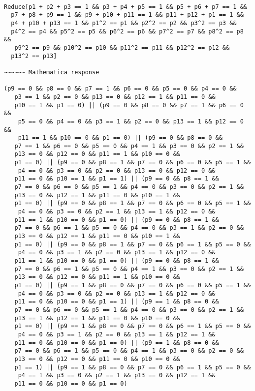 \documentclass[%
 showpacs,
 showkeys,
 preprintnumbers,
 amsmath,amssymb,
 aps,
  pra,
  longbibliography,
 floatfix,
 ]{revtex4-1}
\begin{document}
{ \begin{lstlisting}[backgroundcolor=\color{yellow!10},framerule=0pt,breaklines=true, frame=tb]

Reduce[p1 + p2 + p3 == 1 && p3 + p4 + p5 == 1 && p5 + p6 + p7 == 1 &&
  p7 + p8 + p9 == 1 && p9 + p10 + p11 == 1 && p11 + p12 + p1 == 1 &&
  p4 + p10 + p13 == 1 && p1^2 == p1 && p2^2 == p2 && p3^2 == p3 &&
  p4^2 == p4 && p5^2 == p5 && p6^2 == p6 && p7^2 == p7 && p8^2 == p8 &&
   p9^2 == p9 && p10^2 == p10 && p11^2 == p11 && p12^2 == p12 &&
  p13^2 == p13]

~~~~~~ Mathematica response

(p9 == 0 && p8 == 0 && p7 == 1 && p6 == 0 && p5 == 0 && p4 == 0 &&
   p3 == 1 && p2 == 0 && p13 == 0 && p12 == 1 && p11 == 0 &&
   p10 == 1 && p1 == 0) || (p9 == 0 && p8 == 0 && p7 == 1 && p6 == 0 &&
    p5 == 0 && p4 == 0 && p3 == 1 && p2 == 0 && p13 == 1 && p12 == 0 &&
    p11 == 1 && p10 == 0 && p1 == 0) || (p9 == 0 && p8 == 0 &&
   p7 == 1 && p6 == 0 && p5 == 0 && p4 == 1 && p3 == 0 && p2 == 1 &&
   p13 == 0 && p12 == 0 && p11 == 1 && p10 == 0 &&
   p1 == 0) || (p9 == 0 && p8 == 1 && p7 == 0 && p6 == 0 && p5 == 1 &&
    p4 == 0 && p3 == 0 && p2 == 0 && p13 == 0 && p12 == 0 &&
   p11 == 0 && p10 == 1 && p1 == 1) || (p9 == 0 && p8 == 1 &&
   p7 == 0 && p6 == 0 && p5 == 1 && p4 == 0 && p3 == 0 && p2 == 1 &&
   p13 == 0 && p12 == 1 && p11 == 0 && p10 == 1 &&
   p1 == 0) || (p9 == 0 && p8 == 1 && p7 == 0 && p6 == 0 && p5 == 1 &&
    p4 == 0 && p3 == 0 && p2 == 1 && p13 == 1 && p12 == 0 &&
   p11 == 1 && p10 == 0 && p1 == 0) || (p9 == 0 && p8 == 1 &&
   p7 == 0 && p6 == 1 && p5 == 0 && p4 == 0 && p3 == 1 && p2 == 0 &&
   p13 == 0 && p12 == 1 && p11 == 0 && p10 == 1 &&
   p1 == 0) || (p9 == 0 && p8 == 1 && p7 == 0 && p6 == 1 && p5 == 0 &&
    p4 == 0 && p3 == 1 && p2 == 0 && p13 == 1 && p12 == 0 &&
   p11 == 1 && p10 == 0 && p1 == 0) || (p9 == 0 && p8 == 1 &&
   p7 == 0 && p6 == 1 && p5 == 0 && p4 == 1 && p3 == 0 && p2 == 1 &&
   p13 == 0 && p12 == 0 && p11 == 1 && p10 == 0 &&
   p1 == 0) || (p9 == 1 && p8 == 0 && p7 == 0 && p6 == 0 && p5 == 1 &&
    p4 == 0 && p3 == 0 && p2 == 0 && p13 == 1 && p12 == 0 &&
   p11 == 0 && p10 == 0 && p1 == 1) || (p9 == 1 && p8 == 0 &&
   p7 == 0 && p6 == 0 && p5 == 1 && p4 == 0 && p3 == 0 && p2 == 1 &&
   p13 == 1 && p12 == 1 && p11 == 0 && p10 == 0 &&
   p1 == 0) || (p9 == 1 && p8 == 0 && p7 == 0 && p6 == 1 && p5 == 0 &&
    p4 == 0 && p3 == 1 && p2 == 0 && p13 == 1 && p12 == 1 &&
   p11 == 0 && p10 == 0 && p1 == 0) || (p9 == 1 && p8 == 0 &&
   p7 == 0 && p6 == 1 && p5 == 0 && p4 == 1 && p3 == 0 && p2 == 0 &&
   p13 == 0 && p12 == 0 && p11 == 0 && p10 == 0 &&
   p1 == 1) || (p9 == 1 && p8 == 0 && p7 == 0 && p6 == 1 && p5 == 0 &&
    p4 == 1 && p3 == 0 && p2 == 1 && p13 == 0 && p12 == 1 &&
   p11 == 0 && p10 == 0 && p1 == 0)

\end{lstlisting}  }
\end{document}
